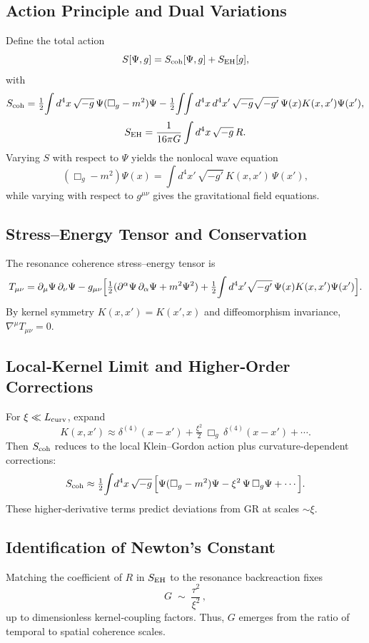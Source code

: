 \subsection{Action Principle and Dual Variations}

Define the total action
\[
S[\Psi,g] = S_{\rm coh}[\Psi,g] + S_{\rm EH}[g],
\]
with
\[
S_{\rm coh} = \tfrac12\!\int d^4x\,\sqrt{-g}\,\Psi(\Box_g - m^2)\Psi
 - \tfrac12\!\int\!\!\int d^4x\,d^4x'\,\sqrt{-g}\sqrt{-g'}\,\Psi(x)K(x,x')\Psi(x'),
\]
\[
S_{\rm EH} = \frac{1}{16\pi G}\int d^4x\,\sqrt{-g}\,R.
\]
Varying \(S\) with respect to \(\Psi\) yields the nonlocal wave equation
\[
(\Box_g - m^2)\Psi(x) = \int d^4x'\,\sqrt{-g'}\,K(x,x')\,\Psi(x'),
\]
while varying with respect to \(g^{\mu\nu}\) gives the gravitational field equations.

\subsection{Stress–Energy Tensor and Conservation}

The resonance coherence stress–energy tensor is
\[
T_{\mu\nu}
= \partial_\mu\Psi\,\partial_\nu\Psi
- g_{\mu\nu}\Bigl[\tfrac12(\partial^\alpha\Psi\,\partial_\alpha\Psi + m^2\Psi^2)
+ \tfrac12\!\int d^4x'\sqrt{-g'}\,\Psi(x)K(x,x')\Psi(x')\Bigr].
\]
By kernel symmetry \(K(x,x')=K(x',x)\) and diffeomorphism invariance, \(\nabla^\mu T_{\mu\nu}=0\).

\subsection{Local‐Kernel Limit and Higher‐Order Corrections}

For \(\xi\ll L_{\rm curv}\), expand
\[
K(x,x') \approx \delta^{(4)}(x-x') 
  + \tfrac{\xi^2}{2}\,\Box_g\,\delta^{(4)}(x-x') + \cdots.
\]
Then \(S_{\rm coh}\) reduces to the local Klein–Gordon action plus curvature‐dependent corrections:
\[
S_{\rm coh} 
\approx \tfrac12\!\int\!d^4x\,\sqrt{-g}\,\Bigl[\Psi(\Box_g - m^2)\Psi
- \xi^2\,\Psi\,\Box_g\Psi + \cdots\Bigr].
\]
These higher‐derivative terms predict deviations from GR at scales \(\sim\xi\).

\subsection{Identification of Newton’s Constant}

Matching the coefficient of \(R\) in \(S_{\rm EH}\) to the resonance backreaction fixes
\[
G \;\sim\;\frac{\tau^2}{\xi^2}\,,
\]
up to dimensionless kernel‐coupling factors.  Thus, \(G\) emerges from the ratio of temporal to spatial coherence scales.

